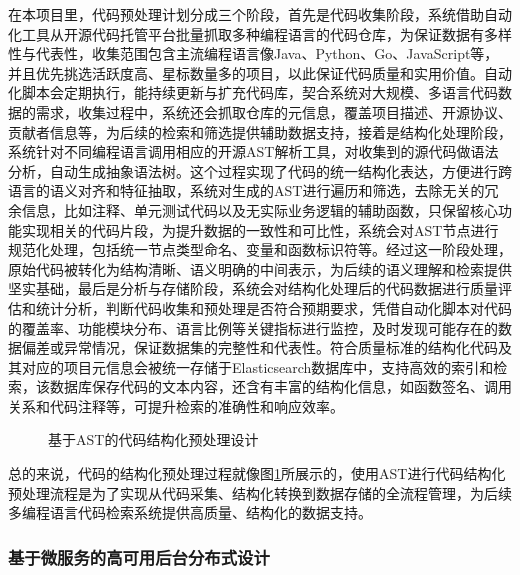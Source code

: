 \documentclass[UTF8,a4paper,12pt]{ctexart}
\numberwithin{equation}{section}
\begin{document}
在本项目里，代码预处理计划分成三个阶段，首先是代码收集阶段，系统借助自动化工具从开源代码托管平台批量抓取多种编程语言的代码仓库，为保证数据有多样性与代表性，收集范围包含主流编程语言像Java、Python、Go、JavaScript等，并且优先挑选活跃度高、星标数量多的项目，以此保证代码质量和实用价值。自动化脚本会定期执行，能持续更新与扩充代码库，契合系统对大规模、多语言代码数据的需求，收集过程中，系统还会抓取仓库的元信息，覆盖项目描述、开源协议、贡献者信息等，为后续的检索和筛选提供辅助数据支持，接着是结构化处理阶段，系统针对不同编程语言调用相应的开源AST解析工具，对收集到的源代码做语法分析，自动生成抽象语法树。这个过程实现了代码的统一结构化表达，方便进行跨语言的语义对齐和特征抽取，系统对生成的AST进行遍历和筛选，去除无关的冗余信息，比如注释、单元测试代码以及无实际业务逻辑的辅助函数，只保留核心功能实现相关的代码片段，为提升数据的一致性和可比性，系统会对AST节点进行规范化处理，包括统一节点类型命名、变量和函数标识符等。经过这一阶段处理，原始代码被转化为结构清晰、语义明确的中间表示，为后续的语义理解和检索提供坚实基础，最后是分析与存储阶段，系统会对结构化处理后的代码数据进行质量评估和统计分析，判断代码收集和预处理是否符合预期要求，凭借自动化脚本对代码的覆盖率、功能模块分布、语言比例等关键指标进行监控，及时发现可能存在的数据偏差或异常情况，保证数据集的完整性和代表性。符合质量标准的结构化代码及其对应的项目元信息会被统一存储于Elasticsearch数据库中，支持高效的索引和检索，该数据库保存代码的文本内容，还含有丰富的结构化信息，如函数签名、调用关系和代码注释等，可提升检索的准确性和响应效率。\par
\begin{figure}[H]
	\caption{基于AST的代码结构化预处理设计}
	\label{pre_pro}
\end{figure}
总的来说，代码的结构化预处理过程就像图\ref{pre_pro}所展示的，使用AST进行代码结构化预处理流程是为了实现从代码采集、结构化转换到数据存储的全流程管理，为后续多编程语言代码检索系统提供高质量、结构化的数据支持。\par
\subsubsection{基于微服务的高可用后台分布式设计}
\end{document}
